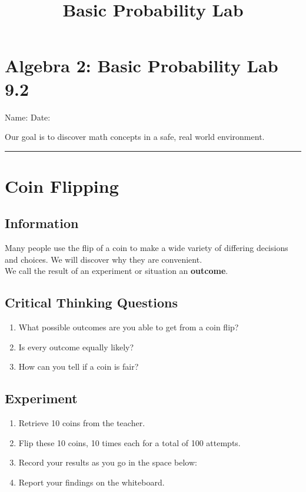 \documentclass[11pt]{article}
\begin{document}
\title{Basic Probability Lab}
\section*{Algebra 2: Basic Probability Lab \hfill 9.2}
Name: \underline{\hspace{3in}} \hfill Date: \underline{\hspace{1in}}
\par
Our goal is to discover math concepts in a safe, real world environment.
\bigskip
\hrule
\section*{Coin Flipping}
\subsection*{Information}
Many people use the flip of a coin to make a wide variety of differing decisions and choices.  We will discover why they are convenient.\\
We call the result of an experiment or situation an \textbf{outcome}.

\subsection*{Critical Thinking Questions}
\begin{enumerate}
\item What possible outcomes are you able to get from a coin flip?
\item Is every outcome equally likely?
\item How can you tell if a coin is fair?
\end{enumerate}

\subsection*{Experiment}
\begin{enumerate}
\item Retrieve 10 coins from the teacher.
\item Flip these 10 coins, 10 times each for a total of 100 attempts.
\item Record your results as you go in the space below:
\vspace{1in}
\item Report your findings on the whiteboard.
\end{enumerate}

\pagebreak
\end{document}
